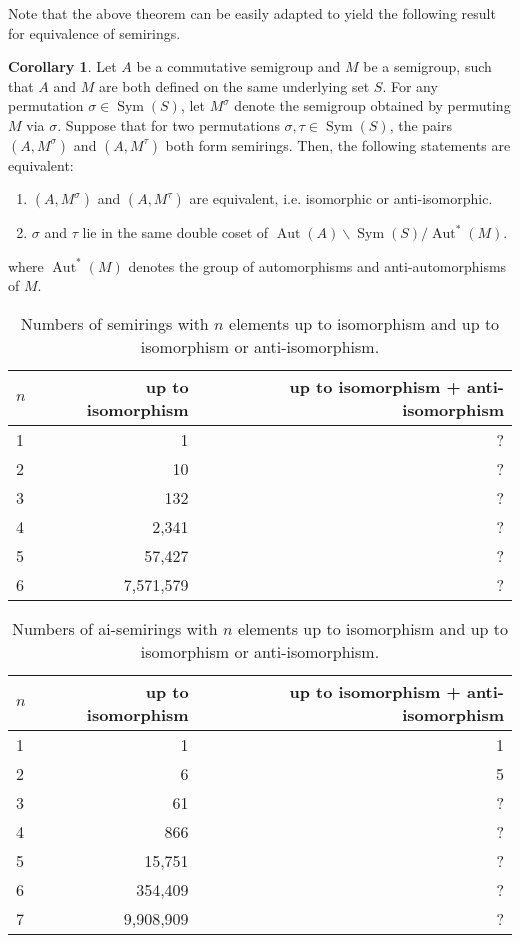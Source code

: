 \documentclass{article}
\theoremstyle{definition}
\newtheorem{cor}{Corollary}
\begin{document}
Note that the above theorem can be easily adapted to yield the following result for equivalence of semirings.
\begin{cor}
    Let \(A\) be a commutative semigroup and \(M\) be a semigroup, such that \(A\) and \(M\) are both defined on the same underlying set \(S\). For any permutation \(\sigma \in \operatorname{Sym}(S)\), let \(M^\sigma\) denote the semigroup obtained by permuting \(M\) via \(\sigma\). Suppose that for two permutations \(\sigma, \tau\in\operatorname{Sym}(S)\), the pairs \((A,M^\sigma)\) and \((A,M^\tau)\) both form semirings. Then, the following statements are equivalent:
    \begin{enumerate}
        \item \((A, M^\sigma)\) and \((A, M^\tau)\) are equivalent, i.e. isomorphic or anti-isomorphic.
        \item \(\sigma\) and \(\tau\) lie in the same double coset of \(\operatorname{Aut}(A) \backslash \operatorname{Sym}(S) / \operatorname{Aut}^*(M)\).
    \end{enumerate}
    where \(\operatorname{Aut}^*(M)\) denotes the group of automorphisms and anti-automorphisms of \(M\).
\end{cor}
\begin{table}[ht]
    \centering
    \begin{tabular}{l|r|r}
      \toprule
      $n$ & up to isomorphism & up to isomorphism + anti-isomorphism \\
      \midrule
      1 & 1         & ? \\
      2 & 10        & ? \\
      3 & 132       & ? \\
      4 & 2,341      & ? \\
      5 & 57,427    & ? \\
      6 & 7,571,579 & ? \\
    \end{tabular}
    \caption{Numbers of semirings with $n$ elements up to isomorphism and up
    to isomorphism or anti-isomorphism.}
    \label{tab:semirings}
\end{table}

\begin{table}[ht]
  \centering
  \begin{tabular}{l|r|r}
    \toprule
    $n$ & up to isomorphism & up to isomorphism + anti-isomorphism \\
    \midrule
    1 & 1         & 1 \\
    2 & 6         & 5 \\
    3 & 61        & ? \\
    4 & 866       & ? \\
    5 & 15,751    & ? \\
    6 & 354,409   & ? \\
    7 & 9,908,909 & ? \\
  \end{tabular}
  \caption{Numbers of ai-semirings with $n$ elements up to isomorphism and up
  to isomorphism or anti-isomorphism.}
  \label{tab:ai-semirings}
\end{table}
\end{document}

